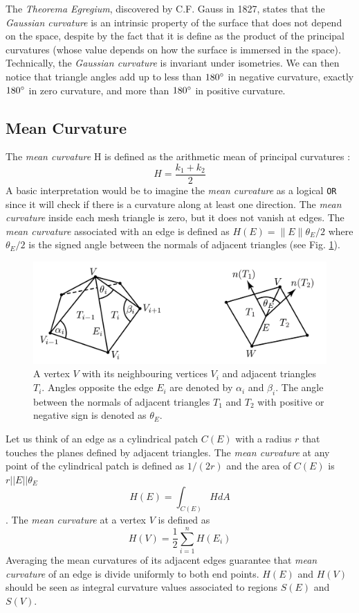 The \textit{Theorema Egregium}, discovered by C.F. Gauss in 1827, states that the \textit{Gaussian curvature} is an intrinsic property of the surface that does not depend on the space, despite by the fact that it is define as the product of the principal curvatures (whose value depends on how the surface is immersed in the space). Technically, the \textit{Gaussian curvature} is invariant under isometries.
We can then notice that triangle angles add up to less than $180 \degree$ in negative curvature, exactly $180 \degree$ in zero curvature, and more than $180 \degree$ in positive curvature.
\cite{geometryprocessing}

\subsection{Mean Curvature}
The \textit{mean curvature} H is defined as the arithmetic mean of principal curvatures : $$H = \frac{k_1 + k_2}{2}$$  A basic interpretation would be to imagine the \textit{mean curvature} as a logical \texttt{OR} since it will check if there is a curvature along at least one direction.\cite{WEBSITE:gaussiancurvaturedirty}
The \textit{mean curvature} inside each mesh triangle is zero, but it does not vanish at edges. The \textit{mean curvature} associated with an edge is defined as $H(E) = \parallel E \parallel {\theta}_E/2$ where ${\theta}_E/2$ is the signed
angle between the normals of adjacent triangles (see Fig. \ref{fig:mean-curvature}).

\begin{figure}[h]
  \centering
\includegraphics[scale=0.4]{images/mean_curvature_paper.png}
\caption{A vertex $V$ with its neighbouring vertices $V_i$ and adjacent triangles $T_i$. Angles opposite the edge $E_i$ are denoted by $\alpha_i$ and $\beta_i$. The
angle between the normals of adjacent triangles $T_1$ and $T_2$ with positive or negative sign is denoted as ${\theta}_E$.\cite{geometryprocessing}}\label{fig:mean-curvature}
\end{figure}
Let us think of an edge as a cylindrical patch $C(E)$ with a radius $r$ that touches the planes defined by adjacent triangles. The \textit{mean curvature} at any point of the cylindrical patch is defined as $1/(2r)$ and the area of $C(E)$ is $r||E||\theta_E$
$$H(E) = \int_{C(E)} HdA$$. The \textit{mean curvature} at a vertex $V$ is defined as $$H(V) = \frac{1}{2} \sum_{i=1}^n H(E_i)$$ Averaging the mean curvatures of its adjacent edges guarantee that \textit{mean curvature} of an edge is divide uniformly to both end points. $H(E)$ and $H(V)$ should be seen as integral curvature values associated to regions $S(E)$ and $S(V)$.
\cite{geometryprocessing}

